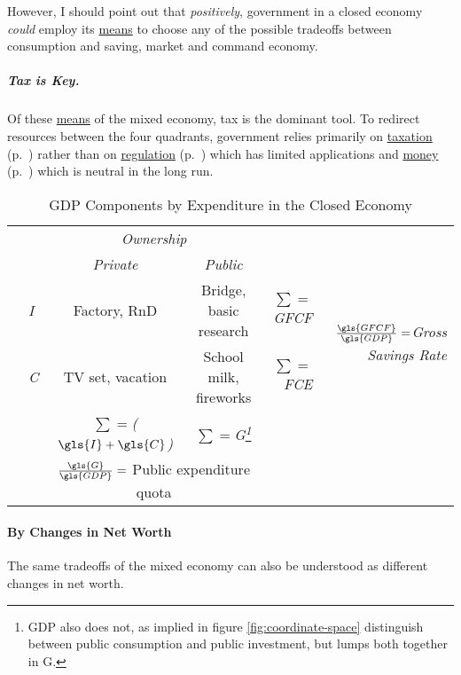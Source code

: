 However, I should point out that \emph{positively}, government in a closed economy \emph{could} employ its \hyperref[sec:means]{means} to choose any of the possible tradeoffs between consumption and saving, market and command economy.

\subparagraph[Tax is Key]{Tax is Key.} Of these \hyperref[sec:means]{means} of the mixed economy, tax is the dominant tool. To redirect resources between the four quadrants, government relies primarily on \hyperref[sec:fiscal]{taxation} (p.~\pageref{sec:fiscal}) rather than on \hyperref[sec:regulatory]{regulation} (p.~\pageref{sec:regulatory}) which has limited applications and \hyperref[sec:monetary]{money} (p.~\pageref{sec:monetary}) which is neutral in the long run.

\begin{landscape}%
\begin{table}
	\caption{GDP Components by Expenditure in the Closed Economy}
	\label{tab:GDPCompExp}
	\small
	\begin{center}
	\renewcommand{\arraystretch}{1.5}
	\begin{tabular}{llccrr}
		\toprule
		& & \multicolumn{2}{c}{\emph{Ownership}} & &\\
		\cmidrule(r){3-4}
		& &\emph{Private} & \emph{Public}& &\\
		\midrule
		\multirow{2}{*}{\emph{}} & \emph{\gls{I}} & Factory,  \gls{RnD} & Bridge, basic research & \emph{$\sum=$\gls{GFCF}} & \multirow{2}{*}{\emph{$\frac{\gls{GFCF}}{\gls{GDP}}=$Gross Savings Rate}}\\
		& \emph{\gls{C}} & TV set, vacation & School milk, fireworks & \emph{$\sum=$\gls{FCE}}  \\
		\midrule
		& &\emph{$\sum=$($\gls{I}+\gls{C}$)} & \emph{$\sum=$\gls{G}\footnote{\Gls{GDP} also does not, as implied in figure \ref{fig:coordinate-space} distinguish between public consumption and public investment, but lumps both together in \gls{G}.}}\\
		\cmidrule(r){3-4}
		& & \multicolumn{2}{c}{$\frac{\gls{G}}{\gls{GDP}}=$ Public expenditure quota} \\
		\bottomrule
	\end{tabular}
	\end{center}
\end{table}
\end{landscape}

\paragraph{By Changes in Net Worth}  \label{sec:deltanetworth} The same tradeoffs of the mixed economy can also be understood as different changes in net worth.

